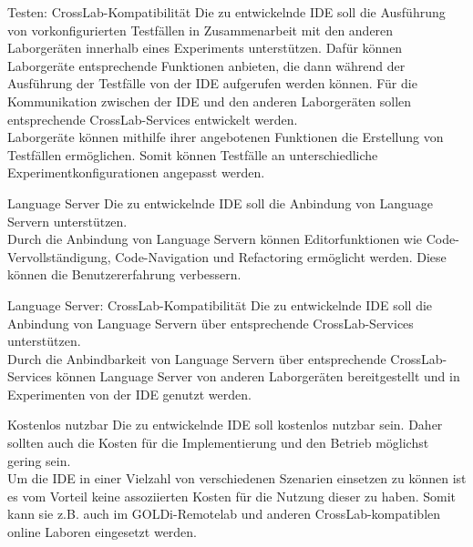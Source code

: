 \begin{requirement}{Testen: CrossLab-Kompatibilität}
  \reqdescription Die zu entwickelnde IDE soll die Ausführung von vorkonfigurierten Testfällen in Zusammenarbeit mit den anderen Laborgeräten innerhalb eines Experiments unterstützen. Dafür können Laborgeräte entsprechende Funktionen anbieten, die dann während der Ausführung der Testfälle von der IDE aufgerufen werden können. Für die Kommunikation zwischen der IDE und den anderen Laborgeräten sollen entsprechende CrossLab-Services entwickelt werden. \\
  \reqrationale Laborgeräte können mithilfe ihrer angebotenen Funktionen die Erstellung von Testfällen ermöglichen. Somit können Testfälle an unterschiedliche Experimentkonfigurationen angepasst werden. \\
\end{requirement}

\begin{requirement}{Language Server}
  \reqdescription Die zu entwickelnde IDE soll die Anbindung von Language Servern unterstützen. \\
  \reqrationale Durch die Anbindung von Language Servern können Editorfunktionen wie Code-Vervollständigung, Code-Navigation und Refactoring ermöglicht werden. Diese können die Benutzererfahrung verbessern. \\
\end{requirement}

\begin{requirement}{Language Server: CrossLab-Kompatibilität}
  \reqdescription Die zu entwickelnde IDE soll die Anbindung von Language Servern über entsprechende CrossLab-Services unterstützen. \\
  \reqrationale Durch die Anbindbarkeit von Language Servern über entsprechende CrossLab-Services können Language Server von anderen Laborgeräten bereitgestellt und in Experimenten von der IDE genutzt werden. \\
\end{requirement}

\begin{requirement}{Kostenlos nutzbar}
  \reqdescription Die zu entwickelnde IDE soll kostenlos nutzbar sein. Daher sollten auch die Kosten für die Implementierung und den Betrieb möglichst gering sein. \\
  \reqrationale Um die IDE in einer Vielzahl von verschiedenen Szenarien einsetzen zu können ist es vom Vorteil keine assoziierten Kosten für die Nutzung dieser zu haben. Somit kann sie z.B. auch im GOLDi-Remotelab und anderen CrossLab-kompatiblen online Laboren eingesetzt werden. \\
\end{requirement}

